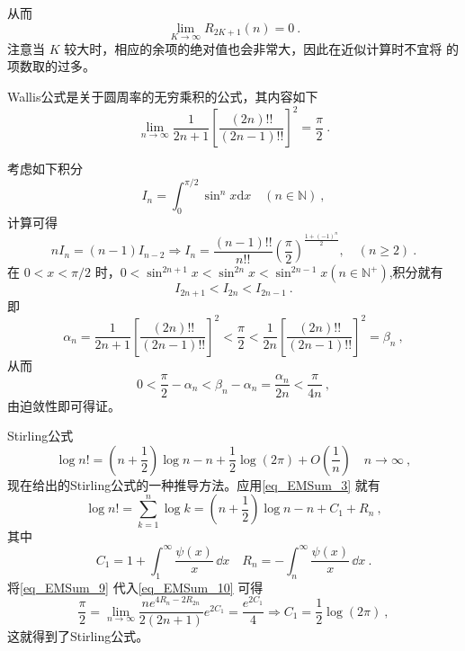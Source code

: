 从而
\[
    \lim\limits_{K\to\infty}R_{2K+1}(n)=0	~.
\]
注意当 $K$ 较大时，相应的余项的绝对值也会非常大，因此在近似计算时不宜将 的项数取的过多。
\begin{lemma}{}
Wallis公式是关于圆周率的无穷乘积的公式，其内容如下
		\begin{equation}\label{eq_EMSum_10}
			\lim_{n\to\infty}\frac{1}{2n+1}\left[\frac{(2n)!!}{(2n-1)!!}\right]^2=\frac{\pi}{2}~.
		\end{equation}
\end{lemma}
考虑如下积分
\begin{equation}
    I_{n}=\int_{0}^{\pi/2}\sin^{n}x\mathrm{d}x\quad(n\in{\mathbb{N}})~,
\end{equation}
计算可得
\[
    nI_{n}=(n-1)I_{n-2}\Rightarrow I_{n}=\frac{(n-1)!!}{n!!}
    \left(\frac{\pi}{2}\right)^{\frac{1+(-1)^n}{2}}, \quad (n\geqslant2)~.
\]
在 $0<x<\pi/2$ 时，$0<\sin^{2n+1}x<\sin^{2n}x<\sin^{2n-1}x(n\in{\mathbb{N}^{+}})$,积分就有
\[
    I_{2n+1}<I_{2n}<I_{2n-1}~.
\]
即
\[
    \alpha_{n}=\frac{1}{2n+1}\left[\frac{(2n)!!}{(2n-1)!!}\right]^2<\frac{\pi}{2}<\frac{1}{2n}\left[\frac{(2n)!!}{(2n-1)!!}\right]^2=\beta_{n}~,
\]
从而
\[
    0<\frac{\pi}{2}-\alpha_{n}<\beta_{n}-\alpha_{n}=\frac{\alpha_{n}}{2n}<\frac{\pi}{4n}~,
\]
由迫敛性即可得证。
\begin{example}{Stirling公式}
\begin{equation}
    \log n!=\left(n+\frac{1}{2}\right)\log n-n+\frac{1}{2}\log(2\pi)
    +O\left(\frac{1}{n}\right)\quad n\to\infty~,
\end{equation}
现在给出的Stirling公式的一种推导方法。应用\autoref{eq_EMSum_3} 就有
\begin{equation}\label{eq_EMSum_9}
    \log n!=\sum_{k=1}^{n}\log k=\left(n+\frac{1}{2}\right)\log n-n+C_{1}+R_{n}~,
\end{equation}
其中
\[
    C_{1}=1+\int_{1}^{\infty}\frac{\psi(x)}{x}\,\dd x\quad
    R_{n}=-\int_{n}^{\infty}\frac{\psi(x)}{x}\,\dd x~.
\]
将\autoref{eq_EMSum_9} 代入\autoref{eq_EMSum_10} 可得
\[
    \frac{\pi}{2}=\lim_{n\to\infty}\frac{ne^{4R_n-2R_{2n}}}{2(2n+1)}e^{2C_{1}}
    =\frac{e^{2C_{1}}}{4}\Rightarrow C_{1}=\frac{1}{2}\log(2\pi)~,
\]
这就得到了Stirling公式。
\end{example}
